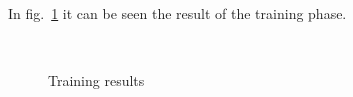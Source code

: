 In fig.~\ref{fig:training results} it can be seen the result of the training phase.
\begin{figure}[htbp]
    \centering
     \quad
    \\
    \caption{Training results}
    \label{fig:training results}
\end{figure}
%
%
